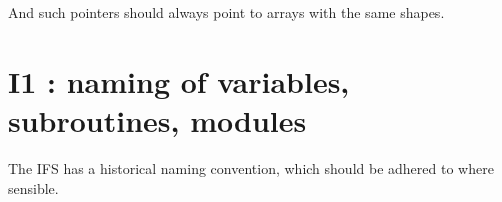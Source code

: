 \documentclass[letterpaper,10pt,english]{sphinxmanual}
\begin{document}
\begin{sphinxVerbatim}[commandchars=\\\{\}]
   
  
   
  
 
\end{sphinxVerbatim}

And such pointers should always point to arrays with the same shapes.


\section{I1 : naming of variables, subroutines, modules}
\label{\detokenize{rules/I1:i1-naming-of-variables-subroutines-modules}}\label{\detokenize{rules/I1::doc}}
The IFS has a historical naming convention, which should be adhered to
where sensible.
\end{document}
